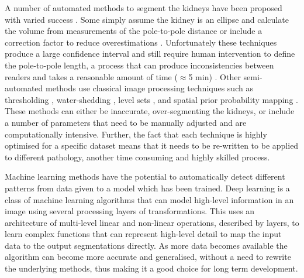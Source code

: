 A number of automated methods to segment the kidneys have been proposed with varied success \cite{zollner_assessment_2012}. Some simply assume the kidney is an ellipse and calculate the volume from measurements of the pole-to-pole distance \cite{cheong_normal_2007, spithoven_estimation_2015} or include a correction factor to reduce overestimations \cite{seuss_development_2017}. Unfortunately these techniques produce a large confidence interval and still require human intervention to define the pole-to-pole length, a process that can produce inconsistencies between readers and takes a reasonable amount of time ($\approx$5 min) \cite{magistroni_review_2018}. Other semi-automated methods use classical image processing techniques such as thresholding \cite{coulam_measurement_2002}, water-shedding \cite{karstoft_different_2007}, level sets \cite{simms_rapid_2019, gloger_prior_2012}, and spatial prior probability mapping \cite{kim_automated_2016}. These methods can either be inaccurate, over-segmenting the kidneys, or include a number of parameters that need to be manually adjusted and are computationally intensive. Further, the fact that each technique is highly optimised for a specific dataset means that it needs to be re-written to be applied to different pathology, another time consuming and highly skilled process.

Machine learning methods have the potential to automatically detect different patterns from data given to a model which has been trained. Deep learning is a class of machine learning algorithms that can model high-level information in an image using several processing layers of transformations. This uses an architecture of multi-level linear and non-linear operations, described by layers, to learn complex functions that can represent high-level detail to map the input data to the output segmentations directly. As more data becomes available the algorithm can become more accurate and generalised, without a need to rewrite the underlying methods, thus making it a good choice for long term development. 

